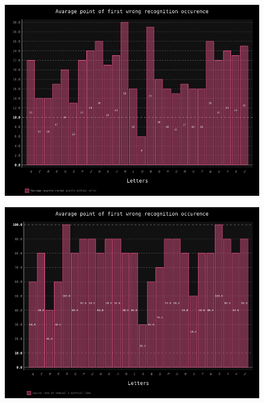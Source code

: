 \documentclass[a4paper]{article}
\begin{document}
\begin{figure}[h!]
	\centering
	\includegraphics[scale=0.7,keepaspectratio=true]{Charts/RandNoiseTestPlanResultsChart_ClasifierTester.png}	
	\caption{}
	\label{noise_clas}
\end{figure}

\begin{figure}[h!]
	\centering
	\includegraphics[scale=0.7,keepaspectratio=true]{Charts/VerLineTestPlanResultsChart_NormalTester.png}	
	\caption{}
	\label{ver_line_trans}
\end{figure}
\end{document}
